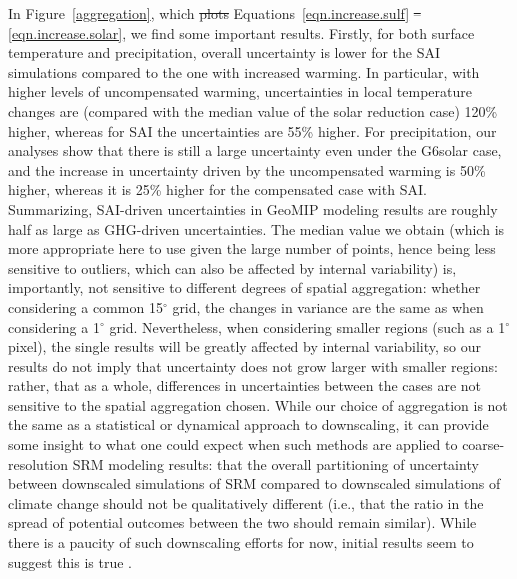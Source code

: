 \documentclass[draft]{agujournal2019}
\providecommand{\DIFadd}[1]{{\protect\color{blue}\uwave{#1}}} %
\providecommand{\DIFdel}[1]{{\protect\color{red}\sout{#1}}}                      %
\providecommand{\DIFaddbegin}{} %
\providecommand{\DIFaddend}{} %
\providecommand{\DIFdelbegin}{} %
\providecommand{\DIFdelend}{} %
\begin{document}
In Figure~\ref{aggregation}, which \DIFdelbegin \DIFdel{plots }\DIFdelend \DIFaddbegin \DIFadd{shows the results of }\DIFaddend Equations~\ref{eqn.increase.sulf} \DIFdelbegin \DIFdel{--}\DIFdelend \DIFaddbegin \DIFadd{and }\DIFaddend \ref{eqn.increase.solar}, we find some important results. Firstly, for both surface temperature and precipitation, overall uncertainty is lower for the SAI simulations compared to the one with increased warming. In particular, with higher levels of uncompensated warming, uncertainties in local temperature changes are (compared with the median value of the solar reduction case) 120\% higher, whereas for SAI the uncertainties are 55\% higher. For precipitation, our analyses show that there is still a large uncertainty even under the G6solar case, and the increase in uncertainty driven by the uncompensated warming is 50\% higher, whereas it is 25\% higher for the compensated case with SAI. Summarizing, SAI-driven uncertainties in GeoMIP modeling results are roughly half as large as GHG-driven uncertainties. The median value we obtain (which is more appropriate here to use given the large number of points, hence being less sensitive to outliers, which can also be affected by internal variability) is, importantly, not sensitive to different degrees of spatial aggregation: whether considering a common 15$^{\circ}$ grid, the changes in variance are the same as when considering a 1$^{\circ}$ grid. Nevertheless, when considering smaller regions (such as a 1$^{\circ}$ pixel), the single results will be greatly affected by internal variability, so our results do not imply that uncertainty does not grow larger with smaller regions: rather, that as a whole, differences in uncertainties between the cases are not sensitive to the spatial aggregation chosen. While our choice of aggregation is not the same as a statistical or dynamical approach to downscaling, it can provide some insight to what one could expect when such methods are applied to coarse-resolution SRM modeling results: that the overall partitioning of uncertainty between downscaled simulations of SRM compared to downscaled simulations of climate change should not be qualitatively different (i.e., that the ratio in the spread of potential outcomes between the two should remain similar). While there is a paucity of such downscaling efforts for now, initial results seem to suggest this is true \cite{Sun2026}.
\end{document}
